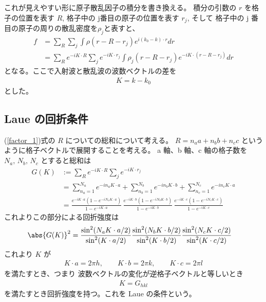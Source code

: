 \documentclass[11pt,dvipdfmx,a4paper]{jsarticle}
\begin{document}
これが見えやすい形に原子散乱因子の積分を書き換える。
積分の引数の \(r\) を格子の位置を表す \(R\), 格子中の j番目の原子の位置を表す \(r_j\), そして
格子中の j 番目の原子の周りの散乱密度を\(\rho_j\)と表すと、
\begin{align}
	f&=\sum_R \sum_{j} \int\rho(r-R-r_j)e^{i(k_0-k)\cdot r} dr\\
	&=\sum_R e^{-iK\cdot R}\sum_j e^{-iK\cdot r_j} \int \rho_j(r-R-r_j) e^{-iK\cdot(r-R-r_j)}dr\label{factor_1}
\end{align}
となる。ここで入射波と散乱波の波数ベクトルの差を
\begin{align}
	K = k -k_0
\end{align}
とした。

\subsection{Laue の回折条件}
(\ref{factor_1})式の \(R\) についての総和について考える。
\(R = n_a a + n_b b + n_c c\) というように格子ベクトルで展開することを考える。
a 軸、b 軸、c 軸の格子数を\(N_a,\,N_b,\,N_c\) とすると総和は
\begin{align}
	G(K) &:= \sum_R e^{-iK\cdot R}\sum_j e^{-iK\cdot r_j}\\
	&= \sum_{n_a=1}^{N_a} e^{-in_aK\cdot a} + \sum_{n_b=1}^{N_b} e^{-in_bK\cdot b} + \sum_{n_c=1}^{N_c} e^{-in_cK\cdot a}\\
	&=\frac{e^{-iK\cdot a} (1-e^{-iN_a K\cdot a})}{1-e^{-iK\cdot a}}\,
	\frac{e^{-iK\cdot b} (1-e^{-iN_b K\cdot b})}{1-e^{-iK\cdot b}}\,
	\frac{e^{-iK\cdot c} (1-e^{-iN_c K\cdot c})}{1-e^{-iK\cdot c}}
\end{align}
これよりこの部分による回折強度は
\begin{align}
	\abs{G(K)}^2 &= \dfrac{\sin^2(N_a K\cdot a/2)}{\sin^2(K\cdot a/2)}
	\dfrac{\sin^2(N_b K\cdot b/2)}{\sin^2(K\cdot b/2)}
	\dfrac{\sin^2(N_c K\cdot c/2)}{\sin^2(K\cdot c/2)}
\end{align}
これより \(K\) が
\begin{align}
	K\cdot a = 2\pi h, \qquad K\cdot b =2\pi k, \qquad K\cdot c =2\pi l
\end{align}
を満たすとき、つまり 波数ベクトルの変化が逆格子ベクトルと等しいとき
\begin{align}
	K = G_{hkl}
\end{align}
を満たすとき回折強度を持つ。これを Laue の条件という。
\end{document}
